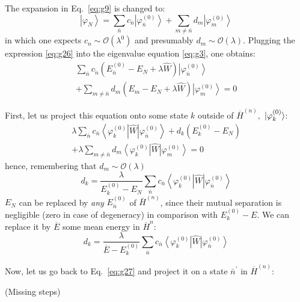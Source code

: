 \documentclass[12pt]{article}
\newcommand{\be}{\begin{equation}}
\newcommand{\ee}{\end{equation}}
\begin{document}
The expansion in Eq.~\eqref{eq:g9} is changed to:
\be
\left|\varphi_{N}\right\rangle=\sum_{\bar{n}} c_{\bar{n}}\left|\varphi_{\bar{n}}^{(0)}\right\rangle+\sum_{m \neq \bar{n}} d_{m}\left|\varphi_{m}^{(0)}\right\rangle
\label{eq:g26}
\ee
in which one expects $c_{n} \sim \mathcal{O}\left(\lambda^{0}\right)$ and presumably
$d_m \sim \mathcal{O}(\lambda)$. Plugging the expression \eqref{eq:g26} into the
eigenvalue equation \eqref{eq:g3}, one obtains:
\be
\begin{gathered}
\sum_{\bar{n}} c_{\tilde{n}}\left(E_{\bar{n}}^{(0)}-E_{N}+\lambda \hat{W}\right)\left|\varphi_{\bar{n}}^{(0)}\right\rangle\\
+\sum_{m\neq\bar{n}} d_{m}\left(E_{m}-E_{N}+\lambda \hat{W}\right)\left|\varphi_{m}^{(0)}\right\rangle = 0\end{gathered}
\label{eq:g27}
\ee


First, let us project this equation onto some state $k$
outside of $\overline{H}^{(n)}$, $\ket*{\varphi_k^{(0)}}$:
\be
\begin{gathered}
\lambda \sum_{\bar{n}} c_{\bar{n}}\left\langle\varphi_{k}^{(0)}|\hat{W}| \varphi_{\bar{n}}^{(0)}\right\rangle+d_{k}\left(E_{k}^{(0)}-E_{N}\right)\\
+\lambda \sum_{m \neq \bar{n}} d_{m}\left\langle\varphi_{k}^{(0)}\right| \hat{W}\left|\varphi_{m}^{(0)}\right\rangle=0
\end{gathered}
\ee
hence, remembering that $d_m \sim \mathcal{O}(\lambda)$
\be
d_{k}=\frac{\lambda}{E_{k}^{(0)}-E_{N}} \sum_{\bar{n}} c_{\bar{n}}\left\langle\varphi_{k}^{(0)}|\hat{W}| \varphi_{\bar{n}}^{(0)}\right\rangle
\ee
$E_{N}$ can be replaced by \emph{any} $E_{\bar{n}}^{(0)}$ of $\bar{H}^{(n)}$, since
their mutual separation is negligible (zero in
case of degeneracy) in comparison with $E_{k}^{(0)}-E$.
We can replace it by $\overline{E}$ some mean energy in $\overline{H}^{n}$:
\be
d_{k}=\frac{\lambda}{\overline{E}-E_{k}^{(0)}} \sum_{\bar{n}} c_{\bar{n}}\left\langle\varphi_{k}^{(0)}\right| \hat{W}\left|\varphi_{\bar{n}}^{(0)}\right\rangle
\ee

Now, let us go back to Eq.~\eqref{eq:g27} and project it
on a state $\bar{n}^\prime$ in $\overline{H}^{(n)}$:

(Missing steps)
\setcounter{equation}{31}

\end{document}

